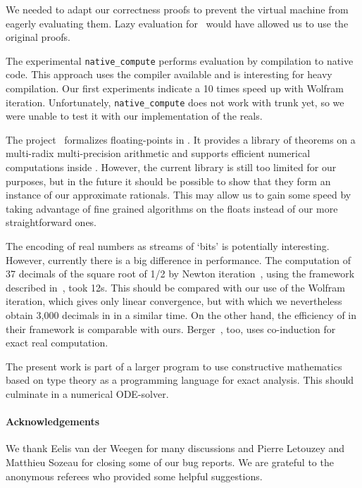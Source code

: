 \documentclass[a4paper,10pt,runningheads]{llncs}
\begin{document}
We needed to adapt our correctness proofs to prevent the virtual machine from eagerly evaluating them. Lazy evaluation for \prop\ would have allowed us to use the original proofs.

The experimental \lstinline|native_compute| performs evaluation by compilation to native \OCaml{} code. This approach uses the \OCaml{} compiler available and is interesting for heavy compilation. Our first experiments indicate a 10 times speed up with Wolfram iteration. Unfortunately, \lstinline|native_compute| does not work with \Coq{} trunk yet, so we were unable to test it with our implementation of the reals.

The \Flocq{} project~\cite{BolMel11} formalizes floating-points in \Coq. It provides a library of theorems on a multi-radix multi-precision arithmetic and supports efficient numerical computations inside \Coq. However, the current library is still too limited for our purposes, but in the future it should be possible to show that they form an instance of our approximate rationals. This may allow us to gain some speed by taking advantage of fine grained algorithms on the floats instead of our more straightforward ones.

The encoding of real numbers as streams of `bits' is potentially interesting. However, currently there is a big difference in performance. The computation of 37 decimals of the square root of 1/2 by Newton iteration~\cite{JulienP09}, using the framework described in~\cite{bertot2007affine,julien2008certified}, took 12s. This should be compared with our use of the Wolfram iteration, which gives only linear convergence, but with which we nevertheless obtain 3,000 decimals in in a similar time. On the other hand, the efficiency of  in their framework is comparable with ours. Berger~\cite{berger2009coinductive}, too, uses co-induction for exact real computation.

The present work is part of a larger program to use constructive mathematics based on type theory as a programming language for exact analysis. This should culminate in a numerical ODE-solver.

\paragraph{Acknowledgements}
We thank Eelis van der Weegen for many discussions and Pierre Letouzey and Matthieu Sozeau for closing some of our bug reports. We are grateful to the anonymous referees who provided some helpful suggestions.



\end{document}
